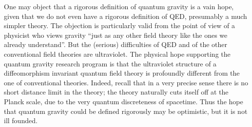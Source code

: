 \documentclass[12pt]{article}
\begin{document}
One may object that a rigorous definition of quantum gravity is a 
vain hope, given that we do not even have a rigorous definition of 
QED, presumably a much simpler theory.  The objection is 
particularly valid from the point of view of a  
physicist who views gravity ``just as any other field theory 
like the ones we already understand''.  But the (serious) 
difficulties of QED and of the other conventional field theories 
are ultraviolet.  The physical hope supporting the quantum 
gravity research program is that the ultraviolet structure of a 
diffeomorphism invariant quantum field theory is profoundly 
different from the one of conventional theories.  Indeed, recall 
that in a very precise sense there is no short distance limit in 
the theory; the theory naturally cuts itself off at the Planck 
scale, due to the very quantum discreteness of spacetime.  Thus 
the hope that quantum gravity could be defined rigorously may be 
optimistic, but it is not ill founded.
\end{document}
